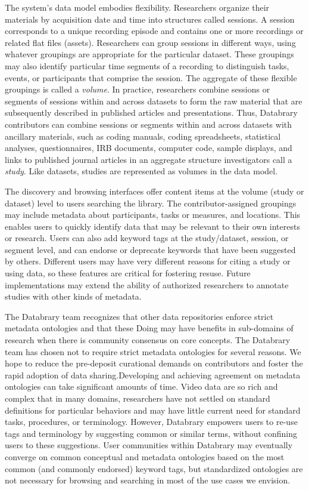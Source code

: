 \documentclass[letterpaper,man,apacite]{apa6}
\begin{document}
The system's data model embodies flexibility. 
Researchers organize their materials by acquisition date and time into structures called sessions.
A session corresponds to a unique recording episode and contains one or more recordings or related flat files (assets). 
Researchers can group sessions in different ways, using whatever groupings are appropriate for
the particular dataset. 
These groupings may also identify particular time segments of a recording to distinguish tasks, events, or
participants that comprise the session. 
The aggregate of these flexible groupings is called a \emph{volume}. 
In practice, researchers combine sessions or segments of sessions within and across datasets to form the raw material that are subsequently described in published articles and presentations. 
Thus, Databrary contributors can combine sessions or segments within and across datasets with ancillary
materials, such as coding manuals, coding spreadsheets, statistical analyses, questionnaires, IRB documents, computer code, sample displays, and links to published journal articles in an aggregate structure investigators call a \emph{study}. 
Like datasets, studies are represented as volumes in the data model.

The discovery and browsing interfaces offer content items at the volume (study or dataset) level to users searching the library. 
The contributor-assigned groupings may include metadata about participants, tasks or measures, and locations.
This enables users to quickly identify data that may be relevant to their own interests or research.
Users can also add keyword tags at the study/dataset, session, or segment level, and can endorse or deprecate keywords that have been suggested by others. 
Different users may have very different reasons for citing a study or using data, so these features are critical for fostering resuse. 
Future implementations may extend the ability of authorized researchers to annotate studies with other kinds of metadata.

The Databrary team recognizes that other data repositories enforce strict metadata ontologies and that these Doing may have benefits in sub-domains of research when there is community consensus on core concepts. 
The Databrary team has chosen not to require strict metadata ontologies for several reasons. 
We hope to reduce the pre-deposit curational demands on contributors and foster the rapid adoption of data sharing.Developing and achieving agreement on metadata ontologies can take significant amounts of time. 
Video data are so rich and complex that in many domains, researchers have not settled on standard definitions for particular behaviors and may have little current need for standard tasks, procedures, or terminology. 
However, Databrary empowers users to re-use tags and terminology by suggesting common or similar terms, without confining users to these suggestions. 
User communities within Databrary may eventually converge on common conceptual and metadata ontologies based on the most common (and commonly endorsed) keyword tags, but standardized ontologies are not necessary for browsing and searching in most of the use cases we envision.
\end{document}
